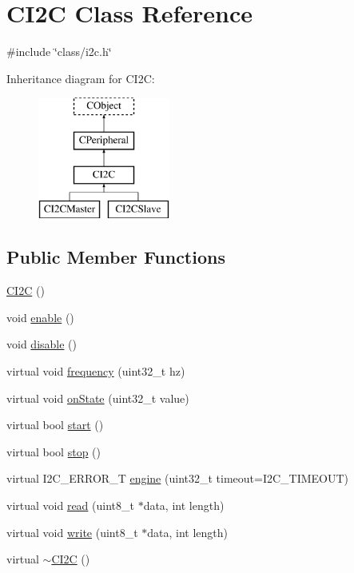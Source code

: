 \hypertarget{class_c_i2_c}{\section{C\-I2\-C Class Reference}
\label{class_c_i2_c}
}


{\ttfamily \#include \char`\"{}class/i2c.\-h\char`\"{}}

Inheritance diagram for C\-I2\-C\-:\begin{figure}[H]
\begin{center}
\leavevmode
\includegraphics[height=4.000000cm]{d0/dce/class_c_i2_c}
\end{center}
\end{figure}
\subsection*{Public Member Functions}
\begin{DoxyCompactItemize}
\item 
\hyperlink{class_c_i2_c_a2df83a2627a8b8bf91460a68372c9ed5}{C\-I2\-C} ()
\item 
void \hyperlink{class_c_i2_c_aeff3f958457f68d453fe125b031c4539}{enable} ()
\item 
void \hyperlink{class_c_i2_c_a36a89b063ac68ff1710193258e76ea73}{disable} ()
\item 
virtual void \hyperlink{class_c_i2_c_ab5158b0fe99495c186200ac1d6ef4e52}{frequency} (uint32\-\_\-t hz)
\item 
virtual void \hyperlink{class_c_i2_c_a20801c3b9529bb0b3b29d51630a399de}{on\-State} (uint32\-\_\-t value)
\item 
virtual bool \hyperlink{class_c_i2_c_a1517b47af85f0129355d2242f124dfbc}{start} ()
\item 
virtual bool \hyperlink{class_c_i2_c_a68800b62b81e6fb291c24db5e0618e56}{stop} ()
\item 
virtual I2\-C\-\_\-\-E\-R\-R\-O\-R\-\_\-\-T \hyperlink{class_c_i2_c_ab0776700fc48c94f200774e832081c7f}{engine} (uint32\-\_\-t timeout=I2\-C\-\_\-\-T\-I\-M\-E\-O\-U\-T)
\item 
virtual void \hyperlink{class_c_i2_c_ac1730f4db280cd2c9b0d73a03317776e}{read} (uint8\-\_\-t $\ast$data, int length)
\item 
virtual void \hyperlink{class_c_i2_c_a379c419607c235a7d723ab4391c2ff2c}{write} (uint8\-\_\-t $\ast$data, int length)
\item 
virtual \hyperlink{class_c_i2_c_a1e66eebc5b74b3f79d44e506a6e72810}{$\sim$\-C\-I2\-C} ()
\end{DoxyCompactItemize}
